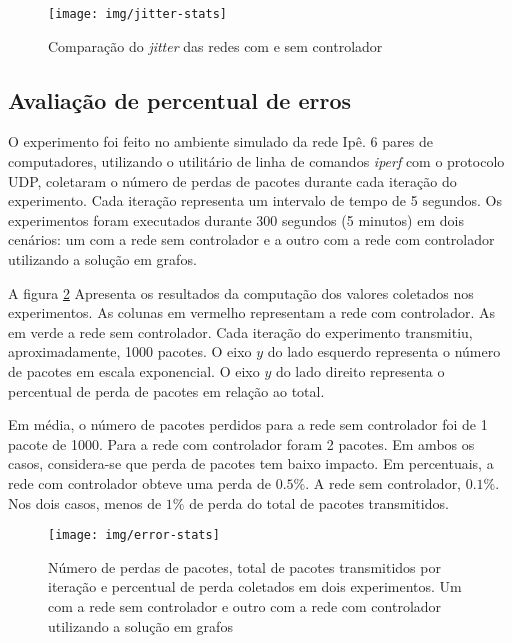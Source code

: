 \begin{figure}[!htb]
    \centering
    \label{fig:jitter-stats}
    \texttt{[image: img/jitter-stats]}
    \caption{Comparação do \emph{jitter} das redes com e sem controlador}
\end{figure}


\subsection{Avaliação de percentual de erros}

O experimento foi feito no ambiente simulado da rede Ipê.
6 pares de computadores, utilizando o utilitário de linha de comandos
\emph{iperf} com o protocolo UDP, coletaram o número de perdas de pacotes
durante cada iteração do experimento.
Cada iteração representa um intervalo de tempo de 5 segundos.
Os experimentos foram executados durante 300 segundos (5 minutos) em dois
cenários: um com a rede sem controlador e a outro com a rede com controlador
utilizando a solução em grafos.

A figura \ref{fig:error-stats} Apresenta os resultados da computação dos
valores coletados nos experimentos.
As colunas em vermelho representam a rede com controlador.
As em verde a rede sem controlador.
Cada iteração do experimento transmitiu, aproximadamente, 1000 pacotes.
O eixo $y$ do lado esquerdo representa o número de pacotes em escala
exponencial.
O eixo $y$ do lado direito representa o percentual de perda de pacotes
em relação ao total.

Em média, o número de pacotes perdidos para a rede sem controlador foi de
1 pacote de 1000.
Para a rede com controlador foram 2 pacotes.
Em ambos os casos, considera-se que perda de pacotes tem baixo impacto.
Em percentuais, a rede com controlador obteve uma perda de $0.5 \%$.
A rede sem controlador, $0.1 \%$.
Nos dois casos, menos de $1 \%$ de perda do total de pacotes transmitidos.

\begin{figure}[!htb]
    \centering
    \label{fig:error-stats}
    \texttt{[image: img/error-stats]}
    \caption{Número de perdas de pacotes, total de pacotes transmitidos por
    iteração e percentual de perda coletados em dois experimentos. Um com a
    rede sem controlador e outro com a rede com controlador utilizando a
    solução em grafos}
\end{figure}

